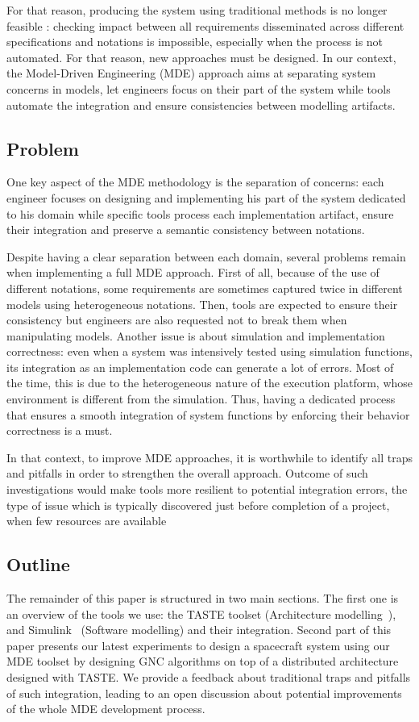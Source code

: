 \documentclass[10pt, conference, compsocconf]{IEEEtran}
\begin{document}
For that reason, producing the system using traditional methods is
no longer feasible : checking impact between all requirements
disseminated across different specifications and notations is 
impossible, especially when the process is not automated. For that
reason, new approaches must be designed. In our context, the Model-Driven
Engineering (MDE) approach aims at separating system concerns in models,
let engineers focus on their part of the system while tools
automate the integration and ensure consistencies between modelling
artifacts.


\subsection{Problem}
One key aspect of the MDE methodology is
the separation of concerns: each engineer focuses on designing
and implementing his part of the system dedicated to his domain
while specific tools process each implementation artifact, ensure 
their integration and preserve a semantic consistency between 
notations. 

Despite having a clear separation between each domain,
several problems remain when implementing a full MDE
approach. First of all, because of the use of different
notations, some requirements are sometimes captured twice in
different models using heterogeneous notations. Then, tools are expected
to ensure their consistency but engineers are also requested
not to break them when manipulating models. Another issue
is about simulation and implementation correctness: even
when a system was intensively tested using simulation functions, its
integration as an implementation code can generate a lot of errors.
Most of the time, this is due to the heterogeneous nature of the
execution platform, whose environment is different from the simulation.
Thus, having a dedicated process that ensures a smooth integration 
of system functions by enforcing their behavior correctness is a must.

In that context, to improve MDE approaches, it is worthwhile 
to identify all traps and pitfalls in order to strengthen the overall
approach. Outcome of such investigations would make tools more 
resilient to potential integration errors, the type of issue which is 
typically discovered just before completion of
a project, when few resources are available 

\subsection{Outline}
The remainder of this paper is structured in two main
sections. The first one is an overview of the tools we use:
the TASTE toolset (Architecture modelling~\cite{bass2003software}), 
 and Simulink~\cite{EE6393A162144B9BBB6B44D9BC0C4742} (Software modelling) and their 
integration. Second part of this paper presents
our latest experiments to design a spacecraft 
system using our MDE toolset by designing 
GNC algorithms on top of a distributed architecture
designed with TASTE. We provide a feedback about traditional
traps and pitfalls of such integration, leading to
an open discussion about potential improvements of the whole MDE development
process.
\end{document}
